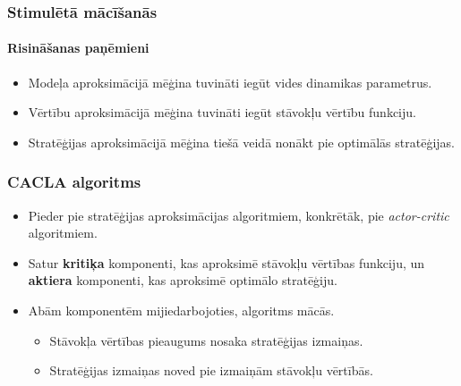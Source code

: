 \documentclass[xetex,mathserif]{beamer}
\begin{document}
  
  \begin{frame}
    \frametitle{Stimulētā mācīšanās}
    \framesubtitle{Risināšanas paņēmieni}
    \begin{itemize}
      \item Modeļa aproksimācijā mēģina tuvināti iegūt vides dinamikas parametrus.
      \item Vērtību aproksimācijā mēģina tuvināti iegūt stāvokļu vērtību funkciju.
      \item Stratēģijas aproksimācijā mēģina tiešā veidā nonākt pie optimālās
        stratēģijas.
    \end{itemize}
  \end{frame}


  \begin{frame}
    \frametitle{CACLA algoritms}
    \begin{itemize}
      \item Pieder pie stratēģijas aproksimācijas algoritmiem, konkrētāk, pie
        \textit{actor-critic} algoritmiem.
      \item Satur \textbf{kritiķa} komponenti, kas aproksimē stāvokļu vērtības
        funkciju, un \textbf{aktiera} komponenti, kas aproksimē optimālo stratēģiju.
      \item Abām komponentēm mijiedarbojoties, algoritms mācās.
        \begin{itemize}
          \item Stāvokļa vērtības pieaugums nosaka stratēģijas izmaiņas.
          \item Stratēģijas izmaiņas noved pie izmaiņām stāvokļu vērtībās.
        \end{itemize}
    \end{itemize}
  \end{frame}
\end{document}
